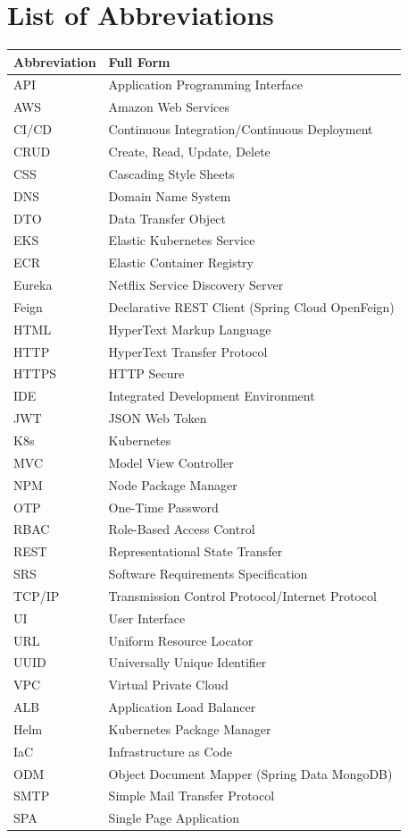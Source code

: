 \chapter*{List of Abbreviations}
\vspace{0.5cm}

\begin{table}[h!]
\centering
\renewcommand{\arraystretch}{1.2}
\begin{tabular}{@{}lp{10cm}@{}}
\toprule
\textbf{Abbreviation} & \textbf{Full Form} \\
\midrule
API & Application Programming Interface \\
AWS & Amazon Web Services \\
CI/CD & Continuous Integration/Continuous Deployment \\
CRUD & Create, Read, Update, Delete \\
CSS & Cascading Style Sheets \\
DNS & Domain Name System \\
DTO & Data Transfer Object \\
EKS & Elastic Kubernetes Service \\
ECR & Elastic Container Registry \\
Eureka & Netflix Service Discovery Server \\
Feign & Declarative REST Client (Spring Cloud OpenFeign) \\
HTML & HyperText Markup Language \\
HTTP & HyperText Transfer Protocol \\
HTTPS & HTTP Secure \\
IDE & Integrated Development Environment \\
JWT & JSON Web Token \\
K8s & Kubernetes \\
MVC & Model View Controller \\
NPM & Node Package Manager \\
OTP & One-Time Password \\
RBAC & Role-Based Access Control \\
REST & Representational State Transfer \\
SRS & Software Requirements Specification \\
TCP/IP & Transmission Control Protocol/Internet Protocol \\
UI & User Interface \\
URL & Uniform Resource Locator \\
UUID & Universally Unique Identifier \\
VPC & Virtual Private Cloud \\
ALB & Application Load Balancer \\
Helm & Kubernetes Package Manager \\
IaC & Infrastructure as Code \\
ODM & Object Document Mapper (Spring Data MongoDB) \\
SMTP & Simple Mail Transfer Protocol \\
SPA & Single Page Application \\
\bottomrule
\end{tabular}
\end{table}
